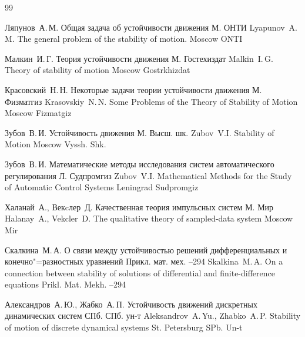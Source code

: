 \begin{thebibliography}{99}

\by Ляпунов~А.\,М.
\book Общая задача об устойчивости движения
\publaddr М.
\publ ОНТИ
\misctransl
\by Lyapunov~A.\,M.
\book The general problem of the stability of motion.
\publaddr Moscow
\publ ONTI

\by Малкин~И.\,Г.
\book Теория устойчивости движения
\publaddr М.
\publ Гостехиздат
\misctransl
\by Malkin~I.\,G.
\book Theory of stability of motion
\publaddr Moscow
\publ Gostrkhizdat


\by Красовский~Н.\,Н.
\book Некоторые задачи теории устойчивости движения
\publaddr М.
\publ Физматгиз
\misctransl
\by Krasovskiy~N.\,N.
\book Some Problems of the Theory of Stability of Motion
\publaddr Moscow
\publ Fizmatgiz

\by Зубов~В.\,И.
\book Устойчивость движения
\publaddr М.
\publ Высш. шк.
\misctransl
\by Zubov~V.I.
\book Stability of Motion
\publaddr Moscow
\publ Vyssh. Shk.

\by Зубов~В.\,И.
\book Математические методы исследования систем
автоматического регулирования
\publaddr Л.
\publ Судпромгиз
\misctransl
\by Zubov~V.I.
\book Mathematical Methods for the Study of Automatic Control Systems
\publaddr Leningrad
\publ Sudpromgiz 


\by Халанай~А., Векcлер~Д.
\book Качественная теория импульсных систем
\publaddr М.
\publ Мир
\misctransl
\by Halanay~A., Vekcler~D.
\book The qualitative theory of sampled-data system
\publaddr Moscow
\publ Mir

\by Скалкина~М.\,А.
\paper О связи между устойчивостью решений дифференциальных и конечно"=разностных уравнений
\jour Прикл. мат. мех.
--294
\misctransl
\by Skalkina~M.\,A.
\paper On a connection between stability of solutions of differential and finite-difference equations
\jour Prikl. Mat. Mekh.
–294

\by Александров~А.\,Ю., Жабко~А.\,П.
\book Устойчивость движений дискретных динамических систем 
\publaddr СПб.
\publ СПб. ун-т
\misctransl
\by Aleksandrov~A.\,Yu., Zhabko~A.\,P. 
\book Stability of motion of discrete dynamical systems
\publaddr St. Petersburg
\publ  SPb. Un-t




\end{thebibliography}

